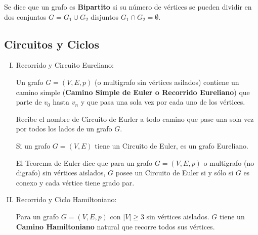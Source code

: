 
 Se dice que un grafo es \textbf{Bipartito} si su número de vértices se 
pueden dividir en dos conjuntos $G = G_1 \cup G_2$ disjuntos $G_1 \cap G_2 = 
\emptyset$.


\subsection{Circuitos y Ciclos}

\begin{enumerate}[I.]

\item Recorrido y Circuito Eureliano:
{
 Un grafo $G = (V,E,p)$ (o multigrafo sin vértices asilados) contiene un 
camino simple (\textbf{Camino Simple de Euler o Recorrido Eureliano}) que parte 
de $v_0$ 
hasta $v_n$ y que pasa una sola vez por cada uno de los vértices.

 Recibe el nombre de Circuito de Eurler a todo camino que pase una sola 
vez 
por todos los lados de un grafo $G$.

{\cor Si un grafo $G = (V,E)$ tiene un Circuito de Euler, es un grafo 
Eureliano.}

{\thm El Teorema de Euler dice que para un grafo $G = (V,E,p)$ o multigrafo 
(no 
digrafo) sin vértices aislados, $G$ posee un Circuito de Euler si y sólo si $G$ 
es conexo y cada vértice tiene grado par.}
}
\item Recorrido y Ciclo Hamiltoniano:
{
 Para un grafo $G = (V,E,p)$ con $|V| \geq 3$ sin vértices aislados. $G$ 
tiene un \textbf{Camino Hamiltoniano} natural que recorre todos sus vértices.

}
\end{enumerate}
